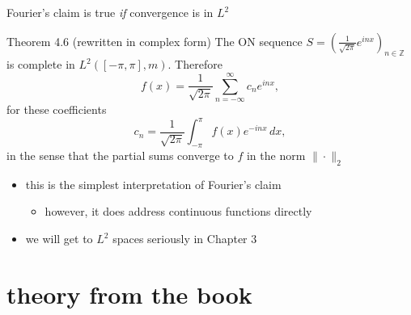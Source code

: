 \documentclass[10pt,
               svgnames,
               hyperref={colorlinks,
                         citecolor=DeepPink4,
                         linkcolor=FireBrick,
                         urlcolor=blue},
               usepdftitle=false]{beamer}
\newcommand{\ZZ}{\mathbb{Z}}
\begin{document}
\begin{frame}{Fourier's claim is true \emph{if} convergence is in $L^2$}

\begin{block}{Theorem 4.6 (rewritten in complex form)}
The ON sequence $S = \left(\frac{1}{\sqrt{2\pi}} e^{inx}\right)_{n\in\ZZ}$ is complete in $L^2([-\pi,\pi],m)$.  Therefore
	$$f(x) = \frac{1}{\sqrt{2\pi}}\sum_{n=-\infty}^\infty c_n e^{inx},$$
for these coefficients
    $$c_n = \frac{1}{\sqrt{2\pi}} \int_{-\pi}^\pi f(x) e^{-inx}\,dx,$$
in the sense that \alert{the partial sums converge to $f$ in the norm $\|\cdot\|_2$}
\end{block}

\begin{itemize}
\item this is the simplest interpretation of Fourier's claim
    \begin{itemize}
    \item[$\circ$] however, it does address continuous functions directly
    \end{itemize}
\item we will get to $L^2$ spaces seriously in Chapter 3
\end{itemize}
\end{frame}


\section{theory from the book}
\end{document}
